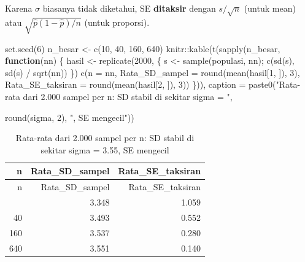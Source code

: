 \documentclass[
  indonesian,
  letterpaper,
]{book}
\newenvironment{Shaded}{\begin{snugshade}}{\end{snugshade}}
\newcommand{\AttributeTok}[1]{\textcolor[rgb]{0.40,0.45,0.13}{#1}}
\newcommand{\ControlFlowTok}[1]{\textcolor[rgb]{0.00,0.23,0.31}{\textbf{#1}}}
\newcommand{\DecValTok}[1]{\textcolor[rgb]{0.68,0.00,0.00}{#1}}
\newcommand{\FunctionTok}[1]{\textcolor[rgb]{0.28,0.35,0.67}{#1}}
\newcommand{\NormalTok}[1]{\textcolor[rgb]{0.00,0.23,0.31}{#1}}
\newcommand{\OtherTok}[1]{\textcolor[rgb]{0.00,0.23,0.31}{#1}}
\newcommand{\SpecialCharTok}[1]{\textcolor[rgb]{0.37,0.37,0.37}{#1}}
\newcommand{\StringTok}[1]{\textcolor[rgb]{0.13,0.47,0.30}{#1}}
\begin{document}
Karena \(\sigma\) biasanya tidak diketahui, SE \textbf{ditaksir} dengan
\(s/\sqrt{n}\) (untuk mean) atau \(\sqrt{\hat{p}(1 - \hat{p})/n}\)
(untuk proporsi).

\begin{Shaded}
\begin{Highlighting}[]
\FunctionTok{set.seed}\NormalTok{(}\DecValTok{6}\NormalTok{)}
\NormalTok{n\_besar }\OtherTok{\textless{}{-}} \FunctionTok{c}\NormalTok{(}\DecValTok{10}\NormalTok{, }\DecValTok{40}\NormalTok{, }\DecValTok{160}\NormalTok{, }\DecValTok{640}\NormalTok{)}
\NormalTok{knitr}\SpecialCharTok{::}\FunctionTok{kable}\NormalTok{(}\FunctionTok{t}\NormalTok{(}\FunctionTok{sapply}\NormalTok{(n\_besar, }\ControlFlowTok{function}\NormalTok{(nn) \{}
\NormalTok{hasil }\OtherTok{\textless{}{-}} \FunctionTok{replicate}\NormalTok{(}\DecValTok{2000}\NormalTok{, \{ s }\OtherTok{\textless{}{-}} \FunctionTok{sample}\NormalTok{(populasi, nn); }\FunctionTok{c}\NormalTok{(}\FunctionTok{sd}\NormalTok{(s), }\FunctionTok{sd}\NormalTok{(s) }\SpecialCharTok{/} \FunctionTok{sqrt}\NormalTok{(nn))}
\NormalTok{ \})}
\FunctionTok{c}\NormalTok{(}\AttributeTok{n =}\NormalTok{ nn, }\AttributeTok{Rata\_SD\_sampel =} \FunctionTok{round}\NormalTok{(}\FunctionTok{mean}\NormalTok{(hasil[}\DecValTok{1}\NormalTok{, ]), }\DecValTok{3}\NormalTok{),}
\AttributeTok{Rata\_SE\_taksiran =} \FunctionTok{round}\NormalTok{(}\FunctionTok{mean}\NormalTok{(hasil[}\DecValTok{2}\NormalTok{, ]), }\DecValTok{3}\NormalTok{))}
\NormalTok{\})), }\AttributeTok{caption =} \FunctionTok{paste0}\NormalTok{(}\StringTok{"Rata{-}rata dari 2.000 sampel per n: SD stabil di sekitar}
\StringTok{ sigma = "}\NormalTok{,}

\FunctionTok{round}\NormalTok{(sigma, }\DecValTok{2}\NormalTok{), }\StringTok{", SE mengecil"}\NormalTok{))}
\end{Highlighting}
\end{Shaded}

\begin{longtable}[]{@{}rrr@{}}
\caption{Rata-rata dari 2.000 sampel per n: SD stabil di sekitar sigma =
3.55, SE mengecil}\tabularnewline
\toprule\noalign{}
n & Rata\_SD\_sampel & Rata\_SE\_taksiran \\
\midrule\noalign{}
\endfirsthead
\toprule\noalign{}
n & Rata\_SD\_sampel & Rata\_SE\_taksiran \\
\midrule\noalign{}
\endhead
\bottomrule\noalign{}
\endlastfoot
10 & 3.348 & 1.059 \\
40 & 3.493 & 0.552 \\
160 & 3.537 & 0.280 \\
640 & 3.551 & 0.140 \\
\end{longtable}
\end{document}
